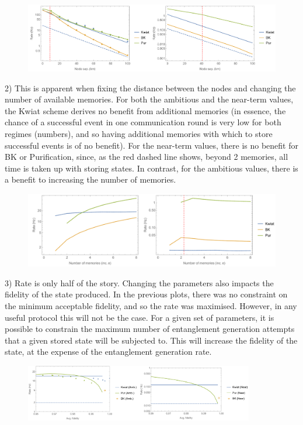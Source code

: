 \documentclass[aps,pra,superscriptaddress,preprint]{revtex4-1}
\begin{document}
\begin{figure}[htbp]
\begin{center}
\includegraphics[width=16.0cm]{AmbAndNearValuesRateVsDistance.pdf}
\caption{}
\label{fig:AmbAndNearValuesRateVsDistance}
\end{center}
\end{figure}

2) This is apparent when fixing the distance between the nodes and changing the number of available memories. For both the ambitious and the near-term values, the Kwiat scheme derives no benefit from additional memories (in essence, the chance of a successful event in one communication round is very low for both regimes (numbers), and so having additional memories with which to store successful events is of no benefit). For the near-term values, there is no benefit for BK or Purification, since, as the red dashed line shows, beyond 2 memories, all time is taken up with storing states. In contrast, for the ambitious values, there is a benefit to increasing the number of memories.

\begin{figure}[htbp]
\begin{center}
\includegraphics[width=16.0cm]{AmbAndNearValuesRateVsMemories.pdf}
\caption{}
\label{fig:AmbAndNearValuesRateVsMemories}
\end{center}
\end{figure}

3) Rate is only half of the story. Changing the parameters also impacts the fidelity of the state produced. In the previous plots, there was no constraint on the minimum acceptable fidelity, and so the rate was maximised. However, in any useful protocol this will not be the case. For a given set of parameters, it is possible to constrain the maximum number of entanglement generation attempts that a given stored state will be subjected to. This will increase the fidelity of the state, at the expense of the entanglement generation rate.

\begin{figure}[htbp]
\begin{center}
\includegraphics[width=10.0cm]{FidVsRateFixedDistance.pdf}
\caption{}
\label{fig:FidVsRateFixedDistance}
\end{center}
\end{figure}
\end{document}
